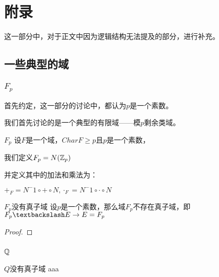 \documentclass[12pt, a4paper, oneside, UTF8]{ctexbook}
\begin{document}
	\else
	\fi
	\chapter{附录}
	这一部分中，对于正文中因为逻辑结构无法提及的部分，进行补充。
		\section{一些典型的域}
			\subsection{$F_p$}
				首先约定，这一部分的讨论中，都认为$p$是一个素数。
				
				我们首先讨论的是一个典型的有限域——模$p$剩余类域。
				
				\begin{defn}{$F_p$}{}
					设$F$是一个域，$Char F \geqslant p$且$p$是一个素数，
					
					我们定义$F_p = N(\mathbb{Z}_p)$
					
					并定义其中的加法和乘法为：
					
					$+_F = N^-1 \circ + \circ N,{\cdot}_F = N^-1 \circ \cdot \circ N$
				\end{defn}
				\begin{them}{$F_p$没有真子域}{}
					设$p$是一个素数，那么域$F_p$不存在真子域，即$F_p \textbackslash E \rightarrow E = F_p$
				\end{them}
				\begin{proof}
					
				\end{proof}
			\subsection{$\mathbb{Q}$}
				\begin{them}{$Q$没有真子域}
					aaa
				\end{them}
	
	\ifx\allfiles\undefined
\end{document}
